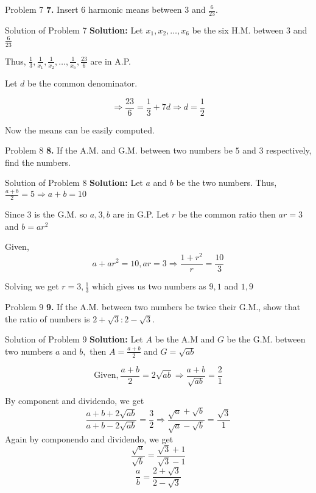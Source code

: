 \documentclass[aspectratio=1610,8pt]{beamer}
\begin{document}
\begin{frame}{Problem 7}
  \textbf{7.} Insert $6$ harmonic means between $3$ and $\frac{6}{23}.$
\end{frame}
\begin{frame}{Solution of Problem 7}
  \textbf{Solution:} Let $x_1, x_2, \ldots, x_6$ be the six H.M. between $3$
  and $\frac{6}{23}$

  Thus, $\frac{1}{3}, \frac{1}{x_1}, \frac{1}{x_2}, \ldots, \frac{1}{x_6},
  \frac{23}{6}$ are in A.P.

  Let $d$ be the common denominator.

  $$\Rightarrow \frac{23}{6} = \frac{1}{3} + 7d \Rightarrow d = \frac{1}{2}$$

  Now the means can be easily computed.
\end{frame}
\begin{frame}{Problem 8}
  \textbf{8.} If the A.M. and G.M. between two numbers be $5$ and $3$
  respectively, find the numbers.
\end{frame}
\begin{frame}{Solution of Problem 8}
  \textbf{Solution:} Let $a$ and $b$ be the two numbers. Thus, $\frac{a + b}{2}
  = 5 \Rightarrow a + b = 10$

  Since $3$ is the G.M. so $a, 3, b$ are in G.P. Let $r$ be the common ratio
  then $ar = 3$ and $b = ar^2$

  Given, $$a + ar^2 = 10, ar = 3 \Rightarrow \frac{1 + r^2}{r} = \frac{10}{3}$$

  Solving we get $r = 3, \frac{1}{3}$ which gives us two numbers as $9, 1$ and
  $1, 9$
\end{frame}
\begin{frame}{Problem 9}
  \textbf{9.} If the A.M. between two numbers be twice their G.M., show that
  the ratio of numbers is $2 + \sqrt{3}: 2 - \sqrt{3}.$
\end{frame}
\begin{frame}{Solution of Problem 9}
  \textbf{Solution:} Let $A$ be the A.M and $G$ be the G.M. between two numbers
  $a$ and $b,$ then $A = \frac{a + b}{2}$ and $G = \sqrt{ab}$

  $$\text{Given,}~ \frac{a + b}{2} = 2\sqrt{ab} \Rightarrow \frac{a +
    b}{\sqrt{ab}} = \frac{2}{1}$$

  By component and dividendo, we get
  $$\frac{a + b + 2\sqrt{ab}}{a + b - 2\sqrt{ab}} = \frac{3}{2} \Rightarrow
  \frac{\sqrt{a} + \sqrt{b}}{\sqrt{a} - \sqrt{b}} = \frac{\sqrt{3}}{1}$$
  Again by componendo and dividendo, we get
  $$\frac{\sqrt{a}}{\sqrt{b}} = \frac{\sqrt{3} + 1}{\sqrt{3} - 1}$$
  $$\frac{a}{b} = \frac{2 + \sqrt{3}}{2 - \sqrt{3}}$$
\end{frame}
\end{document}
